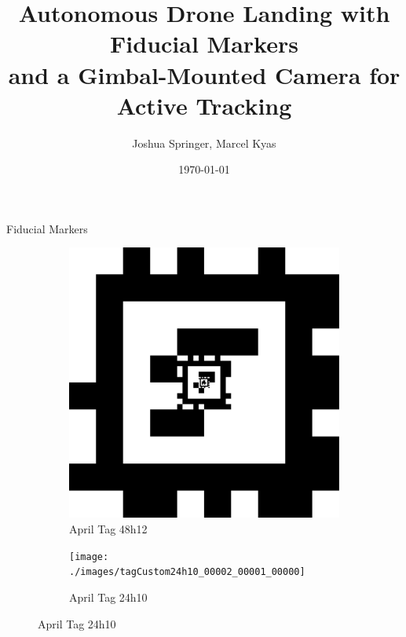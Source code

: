 \documentclass[aspectratio=169]{beamer}
\title{Autonomous Drone Landing with Fiducial Markers\\and a Gimbal-Mounted Camera for Active Tracking}
\author{Joshua Springer, Marcel Kyas}
\institute{Reykjavik University\\Department of Computer Science}
\date{\specialdate\today}
\newcommand{\nologo}{\setbeamertemplate{logo}{}}
\begin{document}
\maketitle

\nologo


\begin{frame}{Fiducial Markers}
	\vspace*{\fill}
	\begin{figure}[]
	    \centering
	    \begin{subfigure}[b]{0.23\linewidth}
		\includegraphics[width=\textwidth]{./images/tagCustom48h12_00002_00001_00000}
		    \caption{April Tag 48h12~\cite{apriltag3_paper}}
		\label{figure:apriltag48h12}
	    \end{subfigure}
		\hspace{0.01\linewidth}
	    \begin{subfigure}[b]{0.23\linewidth}
		\texttt{[image: ./images/tagCustom24h10\_00002\_00001\_00000]}
		    \caption{April Tag 24h10~\cite{fiducial_precursor_evaluation}}
		\label{figure:apriltag24h10}
	    \end{subfigure}

\end{figure}
\end{frame}
\end{document}
